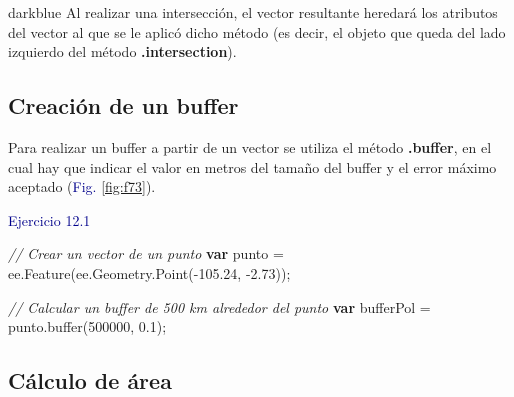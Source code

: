 \documentclass[
  12pt,
  letterpaper,
  twoside]{book}
\newenvironment{Shaded}{\begin{snugshade}}{\end{snugshade}}
\newcommand{\AttributeTok}[1]{\textcolor[rgb]{0.48,0.12,0.64}{#1}}
\newcommand{\CommentTok}[1]{\textcolor[rgb]{0.24,0.58,0.00}{\textit{#1}}}
\newcommand{\ControlFlowTok}[1]{\textcolor[rgb]{0.00,0.00,0.00}{\textbf{#1}}}
\newcommand{\DecValTok}[1]{\textcolor[rgb]{0.28,0.53,0.93}{#1}}
\newcommand{\FloatTok}[1]{\textcolor[rgb]{0.28,0.53,0.93}{#1}}
\newcommand{\FunctionTok}[1]{\textcolor[rgb]{0.48,0.12,0.64}{#1}}
\newcommand{\KeywordTok}[1]{\textcolor[rgb]{0.48,0.12,0.64}{#1}}
\newcommand{\NormalTok}[1]{#1}
\newcommand{\OperatorTok}[1]{\textcolor[rgb]{0.00,0.00,0.00}{#1}}
\newcommand\boldpurple[1]{\textcolor{darkpurple}{\textbf{#1}}}
\begin{document}
\begin{bluebox2}

\begin{awesomeblock}{5pt}{\faLightbulb}{darkblue}
Al realizar una intersección, el vector resultante heredará los atributos del vector al que se le aplicó dicho método (es decir, el objeto que queda del lado izquierdo del método \boldpurple{.intersection}).

\end{awesomeblock}

\end{bluebox2}

\hypertarget{creaciuxf3n-de-un-buffer}{%
\subsection*{Creación de un buffer}\label{creaciuxf3n-de-un-buffer}}

Para realizar un buffer a partir de un vector se utiliza el método \boldpurple{.buffer}, en el cual hay que indicar el valor en metros del tamaño del buffer y el error máximo aceptado (\textcolor{darkblue}{Fig.} \ref{fig:f73}).

\textcolor{darkblue}{Ejercicio 12.1}

\begin{Shaded}
\begin{Highlighting}[]
\CommentTok{// Crear un vector de un  punto}
\ControlFlowTok{var}\NormalTok{ punto }\OperatorTok{=} \KeywordTok{ee}\OperatorTok{.}\FunctionTok{Feature}\NormalTok{(}\KeywordTok{ee}\OperatorTok{.}\AttributeTok{Geometry}\OperatorTok{.}\FunctionTok{Point}\NormalTok{(}\OperatorTok{{-}}\FloatTok{105.24}\OperatorTok{,} \OperatorTok{{-}}\FloatTok{2.73}\NormalTok{))}\OperatorTok{;}

\CommentTok{// Calcular un buffer de 500 km alrededor del punto}
\ControlFlowTok{var}\NormalTok{ bufferPol }\OperatorTok{=}\NormalTok{ punto}\OperatorTok{.}\FunctionTok{buffer}\NormalTok{(}\DecValTok{500000}\OperatorTok{,} \FloatTok{0.1}\NormalTok{)}\OperatorTok{;}
\end{Highlighting}
\end{Shaded}

\hypertarget{cuxe1lculo-de-uxe1rea}{%
\subsection*{Cálculo de área}\label{cuxe1lculo-de-uxe1rea}}
\end{document}
